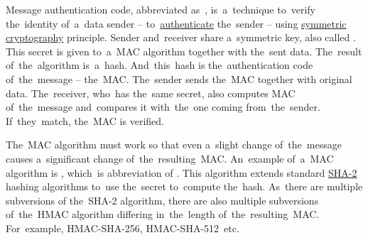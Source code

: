 \label{mac}
Message authentication code, abbreviated as~, is~a~technique to~verify the~identity of~a~data sender -- to~\hyperref[authenticationauthorization]{authenticate} the~sender -- using \hyperref[symmetriccryptography]{symmetric cryptography} principle.
Sender and~receiver share a~symmetric key, also called .
This secret is given to~a~MAC algorithm together with the~sent data.
The~result of~the~algorithm is~a~hash.
And~this~hash is the~authentication code of~the~message -- the~MAC\@.
The~sender sends the~MAC together with original data.
The~receiver, who~has the~same secret, also computes MAC of~the~message and~compares it with~the~one coming from~the~sender.
If~they~match, the~MAC is verified.

The~MAC algorithm must work so that even a~slight change of~the~message causes a~significant change of~the~resulting~MAC\@.
An~example of~a~MAC algorithm is , which~is abbreviation of .
This algorithm extends standard \hyperref[sha]{\mbox{SHA-2}} hashing algorithms to~use the~secret to~compute the~hash.
As~there are multiple subversions of \mbox{the SHA-2} algorithm, there are also multiple subversions of~the~HMAC algorithm differing in~the~length of~the~resulting~MAC\@.
For~example, \mbox{HMAC-SHA-256,} \mbox{HMAC-SHA-512 etc.}
